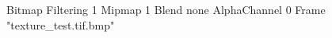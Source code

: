 {Bitmap
	{Filtering 1}
	{Mipmap 1}
	{Blend none}
	{AlphaChannel 0}
	{Frame "texture_test.tif.bmp"}
}

